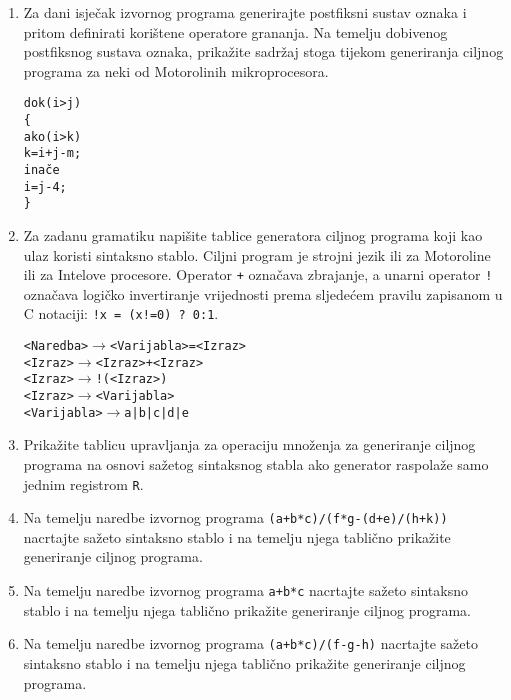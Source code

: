 \documentclass[times, 12pt, utf8]{book}
\begin{document}
\begin{enumerate}[resume]
\item
Za dani isječak izvornog programa generirajte postfiksni sustav oznaka i pritom definirati korištene operatore grananja.
Na temelju dobivenog postfiksnog sustava oznaka, prikažite sadržaj stoga tijekom generiranja ciljnog programa za neki od Motorolinih mikroprocesora. \cite[str.~256-257, 279-280]{udzbenik}

\begin{alltt}
dok (i>j)
\verb|{|
  ako (i>k)
    k=i+j-m;
  inače
    i=j-4;
\verb|}|
\end{alltt} 

\item
Za zadanu gramatiku napišite tablice generatora ciljnog programa koji kao ulaz koristi sintaksno stablo.
Ciljni program je strojni jezik ili za Motoroline ili za Intelove procesore.
Operator \texttt{+} označava zbrajanje, a unarni operator \texttt{!} označava logičko invertiranje vrijednosti prema sljedećem pravilu zapisanom u C notaciji: \texttt{!x = (x!=0) ? 0:1}. \cite[str.~281-283]{udzbenik}

\begin{alltt}
<Naredba> \(\to\) <Varijabla> = <Izraz>
<Izraz> \(\to\) <Izraz> + <Izraz>
<Izraz> \(\to\) ! ( <Izraz> )
<Izraz> \(\to\) <Varijabla>
<Varijabla> \(\to\) a | b | c | d | e
\end{alltt} 

\item
Prikažite tablicu upravljanja za operaciju množenja za generiranje ciljnog programa na osnovi sažetog sintaksnog stabla ako generator raspolaže samo jednim registrom \texttt{R}. \cite[str.~281-283]{udzbenik}

\item
Na temelju naredbe izvornog programa \texttt{(a+b*c)/(f*g-(d+e)/(h+k))} nacrtajte sažeto sintaksno stablo i na temelju njega tablično prikažite generiranje ciljnog programa. \cite[str.~261-262, 281-284]{udzbenik}

\item
Na temelju naredbe izvornog programa \texttt{a+b*c} nacrtajte sažeto sintaksno stablo i na temelju njega tablično prikažite generiranje ciljnog programa. \cite[str.~261-262, 281-284]{udzbenik}

\item
Na temelju naredbe izvornog programa \texttt{(a+b*c)/(f-g-h)} nacrtajte sažeto sintaksno stablo i na temelju njega tablično prikažite generiranje ciljnog programa. \cite[str.~261-262, 281-284]{udzbenik}


\end{enumerate}
\end{document}
